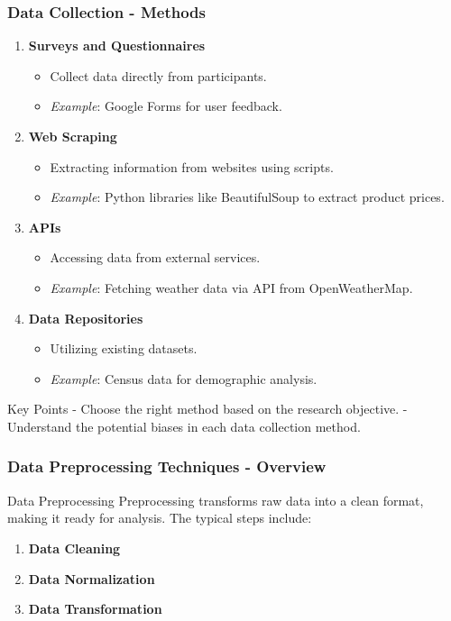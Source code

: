 \documentclass{beamer}
\begin{document}
\begin{frame}[fragile]
    \frametitle{Data Collection - Methods}
    \begin{enumerate}
        \item \textbf{Surveys and Questionnaires}
        \begin{itemize}
            \item Collect data directly from participants.
            \item \textit{Example}: Google Forms for user feedback.
        \end{itemize}
        
        \item \textbf{Web Scraping}
        \begin{itemize}
            \item Extracting information from websites using scripts.
            \item \textit{Example}: Python libraries like BeautifulSoup to extract product prices.
        \end{itemize}
        
        \item \textbf{APIs}
        \begin{itemize}
            \item Accessing data from external services.
            \item \textit{Example}: Fetching weather data via API from OpenWeatherMap.
        \end{itemize}
        
        \item \textbf{Data Repositories}
        \begin{itemize}
            \item Utilizing existing datasets.
            \item \textit{Example}: Census data for demographic analysis.
        \end{itemize}
    \end{enumerate}
    \begin{block}{Key Points}
        - Choose the right method based on the research objective.
        - Understand the potential biases in each data collection method.
    \end{block}
\end{frame}

\begin{frame}[fragile]
    \frametitle{Data Preprocessing Techniques - Overview}
    \begin{block}{Data Preprocessing}
        Preprocessing transforms raw data into a clean format, making it ready for analysis. The typical steps include:
    \end{block}
    
    \begin{enumerate}
        \item \textbf{Data Cleaning}
        \item \textbf{Data Normalization}
        \item \textbf{Data Transformation}
    \end{enumerate}
\end{frame}
\end{document}
